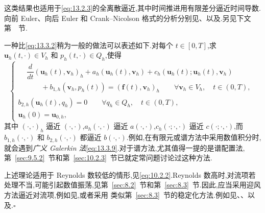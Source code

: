 这类结果也适用于\eqref{eq:13.2.3}的全离散逼近,其中时间推进用有限差分逼近时间导数.向前 Euler、向后 Euler 和 Crank--Nicolson 格式的分析分别见、以及.另见下文第~~节.

一种比\eqref{eq:13.3.2}稍为一般的做法可以表述如下.对每个 \(t\in[0,T]\),求 \(\boldsymbol{u}_h(t,\cdot)\in V_h\) 和 \(p_h(t,\cdot)\in Q_h\),使得
\begin{equation}\label{eq:13.3.9}
  \begin{cases}
    \begin{aligned}
      &\dfrac{d}{dt}(\boldsymbol{u}_h(t),\boldsymbol{v}_h)_h+a_h(\boldsymbol{u}_h(t),\boldsymbol{v}_h)
           +c_h(\boldsymbol{u}_h(t);\boldsymbol{u}_h(t),\boldsymbol{v}_h)\\
      &\qquad+b_{1,h}(\boldsymbol{v}_h,p_h(t))=(\boldsymbol{f}(t),\boldsymbol{v}_h)_h
           \qquad\forall\boldsymbol{v}_h\in V_h,\quad t\in(0,T),
    \end{aligned}\\[2pt]
    b_{2,h}(\boldsymbol{u}_h(t),q_h)=0\qquad\forall q_h\in Q_h,\quad t\in(0,T),\\
    \boldsymbol{u}_h(0)=\boldsymbol{u}_{0,h},
  \end{cases}
\end{equation}
其中 \((\cdot,\cdot)_h\) 逼近 \((\cdot,\cdot)\),\(a_h(\cdot,\cdot)\) 逼近 \(a(\cdot,\cdot)\),\(c_h(\cdot;\cdot,\cdot)\) 逼近 \(c(\cdot;\cdot,\cdot)\),而 \(b_{1,h}(\cdot,\cdot)\) 和 \(b_{2,h}(\cdot,\cdot)\) 都逼近 \(b(\cdot,\cdot)\).例如,在有限元或谱方法中采用数值积分时,就会遇到\emph{广义 Galerkin 法}\eqref{eq:13.3.9}.对于谱方法,尤其值得一提的是谱配置法,第~\ref{sec:9.5.2}~节和第~\ref{sec:10.2.3}~节已就定常问题讨论过这种方法.

\begin{note}
上述理论适用于 Reynolds 数较低的情形,见\eqref{eq:10.2.2}.Reynolds 数高时,对流项若处理不当,可能引起数值振荡,见第~\ref{sec:8.2}~节和第~\ref{sec:8.3}~节.因此,应当采用迎风方法逼近对流项,例如见,或者采用
类似第~\ref{sec:8.3}~节的稳定化方法.例如见、、以及.\hfill\(\square\)
\end{note}

